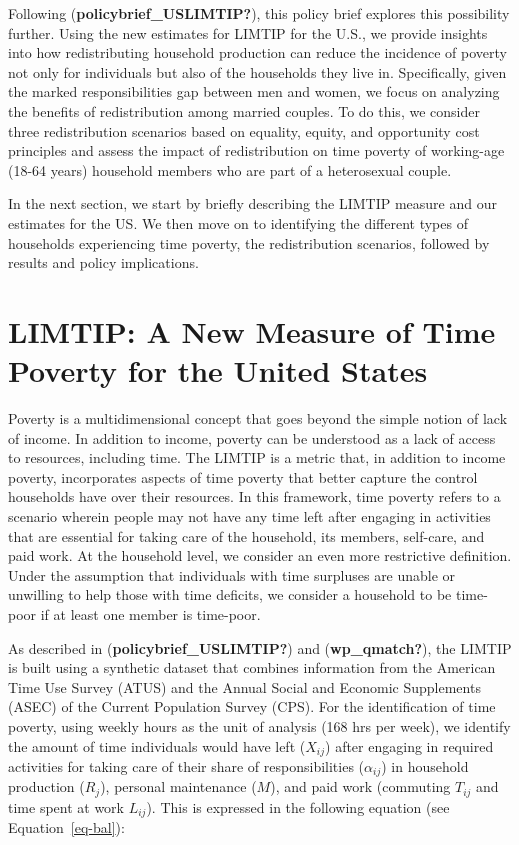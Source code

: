 \documentclass[
  11pt,
]{article}
\begin{document}
Following (\textbf{policybrief\_USLIMTIP?}), this policy brief explores
this possibility further. Using the new estimates for LIMTIP for the
U.S., we provide insights into how redistributing household production
can reduce the incidence of poverty not only for individuals but also of
the households they live in. Specifically, given the marked
responsibilities gap between men and women, we focus on analyzing the
benefits of redistribution among married couples. To do this, we
consider three redistribution scenarios based on equality, equity, and
opportunity cost principles and assess the impact of redistribution on
time poverty of working-age (18-64 years) household members who are part
of a heterosexual couple.

In the next section, we start by briefly describing the LIMTIP measure
and our estimates for the US. We then move on to identifying the
different types of households experiencing time poverty, the
redistribution scenarios, followed by results and policy implications.

\section{LIMTIP: A New Measure of Time Poverty for the United
States}\label{limtip-a-new-measure-of-time-poverty-for-the-united-states}

Poverty is a multidimensional concept that goes beyond the simple notion
of lack of income. In addition to income, poverty can be understood as a
lack of access to resources, including time. The LIMTIP is a metric
that, in addition to income poverty, incorporates aspects of time
poverty that better capture the control households have over their
resources. In this framework, time poverty refers to a scenario wherein
people may not have any time left after engaging in activities that are
essential for taking care of the household, its members, self-care, and
paid work. At the household level, we consider an even more restrictive
definition. Under the assumption that individuals with time surpluses
are unable or unwilling to help those with time deficits, we consider a
household to be time-poor if at least one member is time-poor.

As described in (\textbf{policybrief\_USLIMTIP?}) and
(\textbf{wp\_qmatch?}), the LIMTIP is built using a synthetic dataset
that combines information from the American Time Use Survey (ATUS) and
the Annual Social and Economic Supplements (ASEC) of the Current
Population Survey (CPS). For the identification of time poverty, using
weekly hours as the unit of analysis (168 hrs per week), we identify the
amount of time individuals would have left (\(X_{ij}\)) after engaging
in required activities for taking care of their share of
responsibilities (\(\alpha_{ij}\)) in household production (\(R_j\)),
personal maintenance (\(M\)), and paid work (commuting \(T_{ij}\) and
time spent at work \(L_{ij}\)). This is expressed in the following
equation (see Equation~\ref{eq-bal}):
\end{document}
